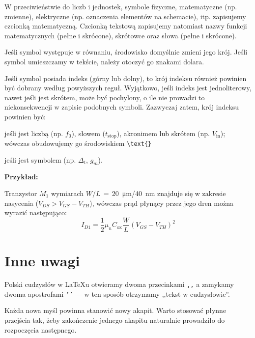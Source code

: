 W przeciwieństwie do liczb i jednostek, symbole fizyczne, matematyczne (np. zmienne), elektryczne (np. oznaczenia elementów na schemacie), itp. zapisujemy czcionką matematyczną. Czcionką tekstową zapisujemy natomiast nazwy funkcji matematycznych (pełne i skrócone), skrótowce oraz słowa (pełne i skrócone).

Jeśli symbol występuje w równaniu, środowisko domyślnie zmieni jego krój. Jeśli symbol umieszczamy w tekście, należy otoczyć go znakami dolara.

Jeśli symbol posiada indeks (górny lub dolny), to krój indeksu również powinien być dobrany według powyższych reguł. Wyjątkowo, jeśli indeks jest jednoliterowy, nawet jeśli jest skrótem, może być pochylony, o ile nie prowadzi to niekonsekwencji w zapisie podobnych symboli. Zazwyczaj zatem, krój indeksu powinien być:

\begin{description}[labelwidth=2.5cm, leftmargin=2.5cm]
    \item[prosty] jeśli jest liczbą (np. $f_\text{0}$), słowem ($t_\text{stop}$), akronimem lub skrótem (np. $V_\text{in}$); wówczas obudowujemy go środowiskiem \texttt{\textbackslash text\{\}}
    \item[pochyły] jeśli jest symbolem (np. $\Delta_t$, $g_m$).
\end{description}

\textbf{Przykład:}

Tranzystor $M_\text{1}$ wymiarach $W$/$L$\,$=$\,\qty{20}{\micro\meter}/\qty{40}{\nano\meter} znajduje się w zakresie nasycenia ($V_{DS} > V_{GS} - V_{TH}$), wówczas prąd płynący przez jego dren można wyrazić następująco:
\begin{equation}
    I_{D\text{1}} = \frac{\num{1}}{\num{2}}\mu_{n}C_\text{ox}\frac{W}{L}\left(V_{GS}-V_{TH}\right)^2
\end{equation}

\section{Inne uwagi}
    Polski cudzysłów w \LaTeX u otwieramy dwoma przecinkami \texttt{{,}{,}} a zamykamy dwoma apostrofami \texttt{{'}{'}} --- w ten sposób otrzymamy ,,tekst w cudzysłowie''.

    Każda nowa myśl powinna stanowić nowy akapit. Warto stosować płynne przejścia tak, żeby zakończenie jednego akapitu naturalnie prowadziło do rozpoczęcia następnego.


